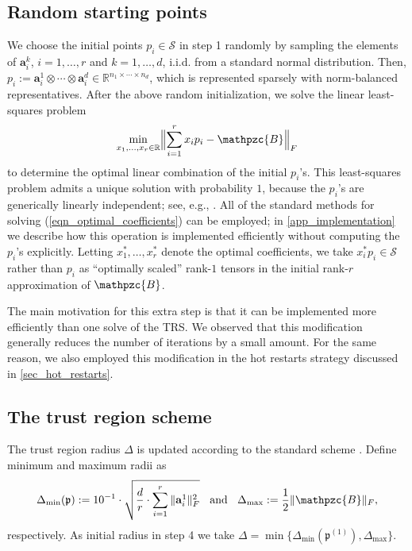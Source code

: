 \documentclass[a4paper,10pt,final]{siamart1116}
\newcommand{\tuple}[1]{\mathfrak{#1}}
\newcommand{\Var}[1]{\mathcal{#1}}
\newcommand{\tensor}[1]{\mathpzc{#1}}
\newcommand{\vect}[1]{\mathbf{#1}}
\newcommand{\sten}[3]{\vect{#1}_{#2}^{#3}}
\newcommand{\R}{\mathbb{R}}
\newcommand{\refeqn}[1]{{(\ref{#1})}}
\newcommand{\refsec}[1]{{\cref{#1}}}
\newcommand{\refapp}[1]{{\cref{#1}}}
\numberwithin{equation}{section}
\numberwithin{figure}{section}
\numberwithin{table}{section}
\numberwithin{theorem}{section}
\begin{document}
\subsection{Random starting points}
We choose the initial points $p_i \in \Var{S}$ in step {1} randomly by sampling the elements of $\sten{a}{i}{k}$, $i=1,\ldots,r$ and $k=1,\ldots,d$, i.i.d. from a standard normal distribution. Then, $p_i := \sten{a}{i}{1} \otimes \cdots \otimes \sten{a}{i}{d} \in \R^{n_1 \times \cdots \times n_d}$, which is represented sparsely with norm-balanced representatives. After the above random initialization, we solve the linear least-squares problem
\begin{align}\label{eqn_optimal_coefficients}
 \min_{x_1,\ldots,x_r\in \R} \Bigl\| \sum_{i=1}^r x_i p_i - \tensor{B} \Bigr\|_F
\end{align}
to determine the optimal linear combination of the initial $p_i$'s. This least-squares problem admits a unique solution with probability $1$, because the $p_i$'s are generically linearly independent; see, e.g., \cite[Corollary 4.5]{COV2017}. All of the standard methods for solving \refeqn{eqn_optimal_coefficients} can be employed; in \refapp{app_implementation} we describe how this operation is implemented efficiently without computing the $p_i$'s explicitly. Letting $x_1^*, \ldots, x_r^*$ denote the optimal coefficients, we take $x_i^* p_i \in \Var{S}$ rather than $p_i$ as ``optimally scaled'' rank-$1$ tensors in the initial rank-$r$ approximation of $\tensor{B}$.

The main motivation for this extra step is that it can be implemented more efficiently than one solve of the TRS. We observed that this modification generally reduces the number of iterations by a small amount. For the same reason, we also employed this modification in the hot restarts strategy discussed in \refsec{sec_hot_restarts}.

\subsection{The trust region scheme}
The trust region radius $\Delta$ is updated according to the standard scheme \cite[chapter 4]{NW2006}.
Define minimum and maximum radii as
\[
 \Delta_{\min}(\tuple{p}) := 10^{-1} \cdot \sqrt{\frac{d}{r} \cdot \sum_{i=1}^r \|\sten{a}{i}{1}\|_F^2}
 \;\;\text{ and }\;\;
 \Delta_{\max} := \frac{1}{2} \| \tensor{B} \|_F,
\]
respectively. As initial radius in step {4} we take
\(
 \Delta = \min\{ \Delta_{\min}(\tuple{p}^{(1)}), \Delta_{\max} \}.
\)
\end{document}
